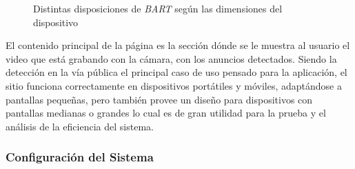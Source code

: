 \documentclass[a4paper]{article}
\begin{document}
\begin{figure}[H]
\caption{Distintas disposiciones de \textit{BART} según las dimensiones del dispositivo}
\end{figure}

El contenido principal de la página es la sección dónde se le muestra al usuario el video que está grabando con la cámara, con los anuncios detectados. Siendo la detección en la vía pública el principal caso de uso pensado para la aplicación, el sitio funciona correctamente en dispositivos portátiles y móviles, adaptándose a pantallas pequeñas, pero también provee un diseño para dispositivos con pantallas medianas o grandes lo cual es de gran utilidad para la prueba y el análisis de la eficiencia del sistema.

\subsubsection{Configuración del Sistema}
\end{document}
